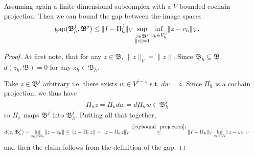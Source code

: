 \documentclass[../master_thesis.tex]{subfiles}
\begin{document}
\begin{proposition}\label{prop:gap_image_spaces}
    Assuming again a finite-dimensional subcomplex with a $V$-bounded cochain projection. 
    Then we can bound the gap between the image spaces
    \begin{align*}
        \operatorname{gap} (\mathfrak{B}^j_h, \mathfrak{B}^j) 
        \leq \lVert I - \Pi_h^j \rVert _V  \sup_{\substack{z \in \mathfrak{B}^j \\ \lVert z \rVert = 1} } 
        \inf_{v_h \in V^j_h} \lVert z - v_h \rVert _V.
    \end{align*}
\end{proposition}
\begin{proof}
    At first note, that for any $z \in \mathfrak{B}$, $\lVert z \rVert _V = \lVert z \rVert$.
    Since $\mathfrak{B}_h \subseteq \mathfrak{B}$, $d(z_h, \mathfrak{B}) = 0$ for any 
    $z_h \in \mathfrak{B}_h$. 
    
    Take $z \in \mathfrak{B}^j$ arbitrary i.e. there exists $w \in V^{j-1}$ s.t. 
    $dw = z$.
    Since $\Pi_h$  is a cochain projection, we thus have 
    \begin{align*}
        \Pi_h z = \Pi_h dw = d \Pi_h w \in \mathfrak{B}_h^j
    \end{align*}
    so $\Pi_h$ maps $\mathfrak{B}^j$ into $\mathfrak{B}^j_h$. Putting all that together,
    \begin{align*}
        d(z,\mathfrak{B}^j_h) = \inf_{z_h \in \mathfrak{B}_h} \lVert z - z_h \rVert 
        \leq \lVert z - \Pi_h z \rVert 
        = \lVert z - \Pi_h z \rVert _V
        \stackrel{(\ref{eq:bound_projection})}{\leq} \lVert I - \Pi_h \rVert _V \inf_{v_h \in V_h} \lVert z - v_h \rVert _V
    \end{align*}
    and then the claim follows from the definition of the gap.
\end{proof}
\end{document}
